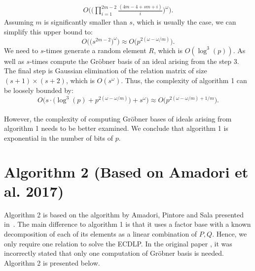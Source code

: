 \documentclass[thesis=M,english]{FITthesis}[2012/10/20]
\theoremstyle{remark}
\theoremstyle{definition}
\begin{document}
\begin{align*}
O\Bigg(\bigg(\prod_{i=1}^{2m-2}\frac{(4m-4+sm + i)}{i}\bigg)^\omega\Bigg).
\end{align*}
Assuming $m$ is significantly smaller than $s$, which is usually the case, we can simplify this upper bound to:
$$
O\Bigg(\bigg(s^{2m-2}\bigg)^\omega\Bigg) \approx O\bigg(p^{2(\omega -\omega/m)}\bigg).
$$
We need to $s$-times generate a random element $R$, which is $O(\log^3(p))$. As well as $s$-times compute the Gröbner basis of an ideal arising from the step 3. The final step is Gaussian elimination of the relation matrix of size $(s + 1)  \times (s+2)$, which is $O(s^\omega)$. Thus, the complexity of algorithm 1 can be loosely bounded by:
$$
O\bigg(s\cdot\big(\log^3(p) + p^{2(\omega -\omega / m)}\big) + s^\omega\bigg) \approx O\bigg(p^{2(\omega -\omega/m) + 1/m}\bigg).
$$
 \\
However, the complexity of computing Gröbner bases of ideals arising from algorithm 1 needs to be better examined. We conclude that algorithm 1 is exponential in the number of bits of $p$.
\section{Algorithm 2 (Based on Amadori et al. 2017)}
Algorithm 2 is based on the algorithm by Amadori, Pintore and Sala presented in~\cite{amadori17}. The main difference to algorithm 1 is that it uses a factor base with a known decomposition of each of its elements as a linear combination of $P,Q$. Hence, we only require one relation to solve the ECDLP. In the original paper \cite{amadori17}, it was incorrectly stated that only one computation of Gröbner basis is needed. Algorithm 2 is presented below. \\
\end{document}
